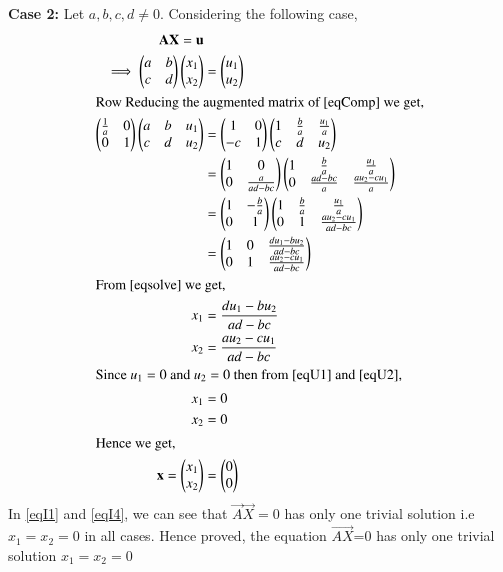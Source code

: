 \documentclass[journal,12pt,twocolumn]{IEEEtran}
\begin{document}
\textbf{Case 2: }Let $a,b,c,d\not=0$. Considering the following case,
\begin{align}
\mathbf{A}\mathbf{X} = \mathbf{u}\\
\implies\begin{pmatrix}a&b\\c&d\end{pmatrix}\begin{pmatrix}x_1\\x_2\end{pmatrix} &=\begin{pmatrix}u_1\\u_2\end{pmatrix}\label{eqComp}\\
\intertext{Row Reducing the augmented matrix of \eqref{eqComp} we get,}
\begin{pmatrix}\frac{1}{a}&0\\0&1\end{pmatrix}\begin{pmatrix}a&b&u_1\\c&d&u_2\end{pmatrix}&=\begin{pmatrix}1&0\\-c&1\end{pmatrix}\begin{pmatrix}1&\frac{b}{a}&\frac{u_1}{a}\\c&d&u_2\end{pmatrix}\\
&=\begin{pmatrix}1&0\\0&\frac{a}{ad-bc}\end{pmatrix}\begin{pmatrix}1&\frac{b}{a}&\frac{u_1}{a}\\0&\frac{ad-bc}{a}&\frac{au_2-cu_1}{a}\end{pmatrix}\\
&=\begin{pmatrix}1&-\frac{b}{a}\\0&1\end{pmatrix}\begin{pmatrix}1&\frac{b}{a}&\frac{u_1}{a}\\0&1&\frac{au_2-cu_1}{ad-bc}\end{pmatrix}\\
&=\begin{pmatrix}1&0&\frac{du_1-bu_2}{ad-bc}\\0&1&\frac{au_2-cu_1}{ad-bc}\end{pmatrix}\label{eqsolve}\\
\intertext{From \eqref{eqsolve} we get,}
x_1 &= \frac{du_1-bu_2}{ad-bc}\label{eqU1}\\
x_2 &= \frac{au_2-cu_1}{ad-bc}\label{eqU2}\\
\intertext{Since $u_1 = 0$ and $u_2 = 0$ then from \eqref{eqU1} and \eqref{eqU2},}
x_1 & = 0\\
x_2 & = 0\\
\intertext{Hence we get,}
\mathbf{x} = \begin{pmatrix}x_1\\x_2\end{pmatrix} &= \begin{pmatrix}0\\0\end{pmatrix}\label{eqI4}
\end{align}
In \eqref{eqI1} and \eqref{eqI4}, we can see that $\vec{A}\vec{X}=0$ has only one trivial solution i.e $x_1=x_2=0$ in all cases. Hence proved, the equation $\vec{AX}$=0 has only one trivial solution $x_1=x_2=0$
\end{document}

